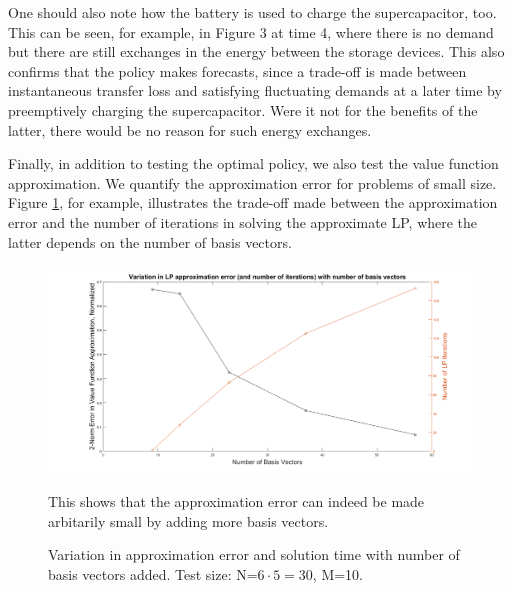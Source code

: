 \documentclass[conference]{IEEEtran}
\begin{document}
One should also note how the battery is used to charge the supercapacitor, too. This can be seen, for example, in Figure 3 at time 4, where there is no demand but there are still exchanges in the energy between the storage devices. This also confirms that the policy makes forecasts, since a trade-off is made between instantaneous transfer loss and satisfying fluctuating demands at a later time by preemptively charging the supercapacitor. Were it not for the benefits of the latter, there would be no reason for such energy exchanges.

Finally, in addition to testing the optimal policy, we also test the value function approximation. We quantify the approximation error for problems of small size. Figure \ref{fig:ApproxVsIter}, for example, illustrates the trade-off made between the approximation error and the number of iterations in solving the approximate LP, where the latter depends on the number of basis vectors.

\begin{figure}[htbp]
\centerline{\includegraphics[scale=0.25]{ApproxErr_vs_NumIter.png}}
\caption{Variation in approximation error and solution time with number of basis vectors added. Test size: N=$6\cdot5=30$, M=10.}
\label{fig:ApproxVsIter}This shows that the approximation error can indeed be made arbitarily small by adding more basis vectors.
\end{figure} %



\end{document}
